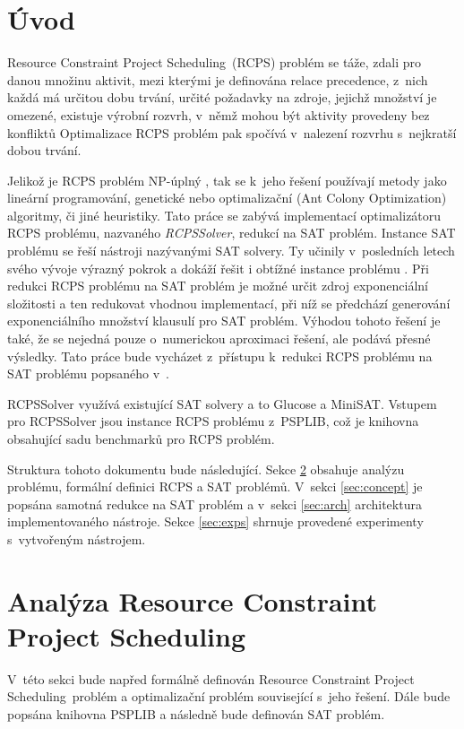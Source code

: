 \documentclass[a4paper, 12pt]{article}
\title{\rcps}
\author{Martin Hruška\\xhrusk16@stud.fit.vutbr.cz}
\date{}
\newcommand{\rcps}[0]{Resource Constraint Project Scheduling}
\begin{document}
\maketitle

\section{Úvod}
\label{sec:intro}
\rcps\ (RCPS) problém se táže, zdali pro danou množinu aktivit, mezi kterými je definována
relace precedence, z~nich každá má určitou dobu trvání, určité požadavky na zdroje, jejichž množství je omezené,
existuje výrobní rozvrh, v~němž mohou být aktivity provedeny bez konfliktů
Optimalizace RCPS problém pak spočívá v~nalezení rozvrhu s~nejkratší dobou trvání.

Jelikož je RCPS problém NP-úplný \cite{artigues:2007}, tak se k~jeho řešení používají metody jako
lineární programování, genetické nebo optimalizační (Ant Colony Optimization) algoritmy, či jiné heuristiky.
Tato práce se zabývá implementací optimalizátoru RCPS problému, nazvaného \emph{RCPSSolver},
redukcí na SAT problém.
Instance SAT problému se řeší nástroji nazývanými SAT solvery.
Ty učinily v~posledních letech svého vývoje výrazný pokrok a dokáží řešit i obtížné instance problému \cite{horbach:10}.
Při redukci RCPS problému na SAT problém je možné určit zdroj exponenciální složitosti a ten
redukovat vhodnou implementací, při níž se předchází generování exponenciálního množství klausulí pro SAT problém.
Výhodou tohoto řešení je také, že se nejedná pouze o~numerickou aproximaci řešení, ale podává přesné výsledky.
Tato práce bude vycházet z~přístupu k~redukci RCPS problému na SAT problému popsaného v~\cite{horbach:10}.

RCPSSolver využívá existující SAT solvery a to Glucose a MiniSAT.
Vstupem pro RCPSSolver jsou instance RCPS problému z~PSPLIB, což je knihovna obsahující sadu benchmarků
pro RCPS problém.

Struktura tohoto dokumentu bude následující.
Sekce \ref{sec:analysis} obsahuje analýzu problému, formální definici RCPS a SAT problémů.
V~sekci \ref{sec:concept} je popsána samotná redukce na SAT problém a v~sekci \ref{sec:arch}
architektura implementovaného nástroje.
Sekce \ref{sec:exps} shrnuje provedené experimenty s~vytvořeným nástrojem.

\section{Analýza \rcps}
\label{sec:analysis}
V~této sekci bude napřed formálně definován \rcps\ problém a optimalizační problém související s~jeho řešení.
Dále bude popsána knihovna PSPLIB a následně bude definován SAT problém.
\end{document}

